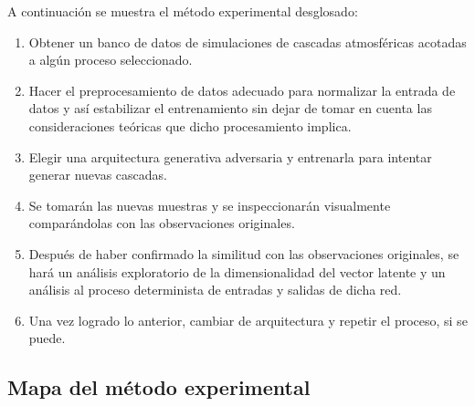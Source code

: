 A continuación se muestra el método experimental desglosado:

\begin{enumerate}[label=\alph*)]
    \item Obtener un banco de datos de simulaciones de cascadas atmosféricas acotadas a algún proceso seleccionado.
    \item Hacer el preprocesamiento de datos adecuado para normalizar la entrada de datos y así estabilizar el entrenamiento sin dejar de tomar en cuenta las consideraciones teóricas que dicho procesamiento implica.
    \item Elegir una arquitectura generativa adversaria y entrenarla para intentar generar nuevas cascadas.
    \item Se tomarán las nuevas muestras y se inspeccionarán visualmente comparándolas con las observaciones originales.
    \item Después de haber confirmado la similitud con las observaciones originales, se hará un análisis exploratorio de la dimensionalidad del vector latente y un análisis al proceso determinista de entradas y salidas de dicha red. 
    \item Una vez logrado lo anterior, cambiar de arquitectura y repetir el proceso, si se puede.
\end{enumerate}

\subsection{Mapa del método experimental}